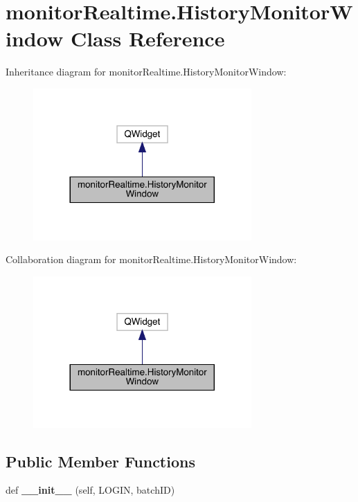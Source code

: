 \hypertarget{classmonitor_realtime_1_1_history_monitor_window}{}\section{monitor\+Realtime.\+History\+Monitor\+Window Class Reference}
\label{classmonitor_realtime_1_1_history_monitor_window}


Inheritance diagram for monitor\+Realtime.\+History\+Monitor\+Window\+:\nopagebreak
\begin{figure}[H]
\begin{center}
\leavevmode
\includegraphics[width=236pt]{classmonitor_realtime_1_1_history_monitor_window__inherit__graph}
\end{center}
\end{figure}


Collaboration diagram for monitor\+Realtime.\+History\+Monitor\+Window\+:\nopagebreak
\begin{figure}[H]
\begin{center}
\leavevmode
\includegraphics[width=236pt]{classmonitor_realtime_1_1_history_monitor_window__coll__graph}
\end{center}
\end{figure}
\subsection*{Public Member Functions}
\begin{DoxyCompactItemize}
\item 
\mbox{\label{classmonitor_realtime_1_1_history_monitor_window_acfa0c19a96ec4fe92c6160d70fd105c9}} 
def {\bfseries \+\_\+\+\_\+init\+\_\+\+\_\+} (self, L\+O\+G\+IN, batch\+ID)
\end{DoxyCompactItemize}


